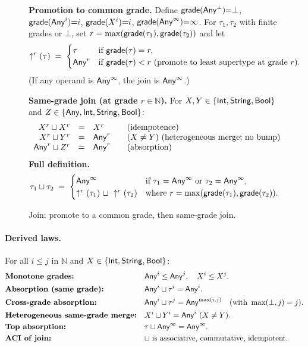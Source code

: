 \begin{figure}[t]
\centering
\textbf{Promotion to common grade.}
Define $\mathsf{grade}(\mathsf{Any}^{\bot}){=}\bot$, $\mathsf{grade}(\mathsf{Any}^{i}){=}i$, $\mathsf{grade}(X^{i}){=}i$, $\mathsf{grade}(\mathsf{Any}^{\infty}){=}\infty$.
For $\tau_1,\tau_2$ with finite grades or $\bot$, set $r=\max(\mathsf{grade}(\tau_1),\mathsf{grade}(\tau_2))$ and let
\[
\uparrow^{r}(\tau) \;=\;
\begin{cases}
\tau & \text{if } \mathsf{grade}(\tau)=r,\\
\mathsf{Any}^{r} & \text{if } \mathsf{grade}(\tau)<r\text{ (promote to least supertype at grade $r$).}
\end{cases}
\]
(If any operand is $\mathsf{Any}^{\infty}$, the join is $\mathsf{Any}^{\infty}$.)

\medskip
\textbf{Same-grade join (at grade $r\in\mathbb{N}$).}
For $X,Y\in\{\mathsf{Int},\mathsf{String},\mathsf{Bool}\}$ and $Z\in\{\mathsf{Any},\mathsf{Int},\mathsf{String},\mathsf{Bool}\}$:
\[
\begin{array}{r@{\quad=\quad}l@{\qquad}l}
X^{r} \sqcup X^{r} & X^{r} & \text{(idempotence)}\\
X^{r} \sqcup Y^{r} & \Any^{r} & (X\neq Y)\ \text{(heterogeneous merge; no bump)}\\
\Any^{r} \sqcup Z^{r} & \Any^{r} & \text{(absorption)}\\
\end{array}
\]
\medskip
\textbf{Full definition.}
\[
\tau_1 \sqcup \tau_2 \;=\;
\begin{cases}
\mathsf{Any}^{\infty} & \text{if }\tau_1=\mathsf{Any}^{\infty}\text{ or }\tau_2=\mathsf{Any}^{\infty},\\
\uparrow^{r}(\tau_1)\ \sqcup\ \uparrow^{r}(\tau_2) & \text{where } r=\max(\mathsf{grade}(\tau_1),\mathsf{grade}(\tau_2)).
\end{cases}
\]
\vspace{-1mm}
\caption{Join: promote to a common grade, then same-grade join.}
\label{fig:join}
\end{figure}

\paragraph{Derived laws.}
For all $i\le j$ in $\mathbb{N}$ and $X\in\{\mathsf{Int},\mathsf{String},\mathsf{Bool}\}$:
\begin{align*}
&\textbf{Monotone grades:} && \mathsf{Any}^{i} \le \mathsf{Any}^{j},\quad X^{i} \le X^{j}.\\
&\textbf{Absorption (same grade):} && \mathsf{Any}^{i} \sqcup \tau^{i} = \mathsf{Any}^{i}.\\
&\textbf{Cross-grade absorption:} && \mathsf{Any}^{i} \sqcup \tau^{j} = \mathsf{Any}^{\max(i,j)}\quad(\text{with }\max(\bot,j)=j).\\
&\textbf{Heterogeneous same-grade merge:} && X^{i} \sqcup Y^{i}=\mathsf{Any}^{i}\ (X\neq Y).\\
&\textbf{Top absorption:} && \tau \sqcup \mathsf{Any}^{\infty}=\mathsf{Any}^{\infty}.\\
&\textbf{ACI of join:} && \text{$\sqcup$ is associative, commutative, idempotent.}
\end{align*}

